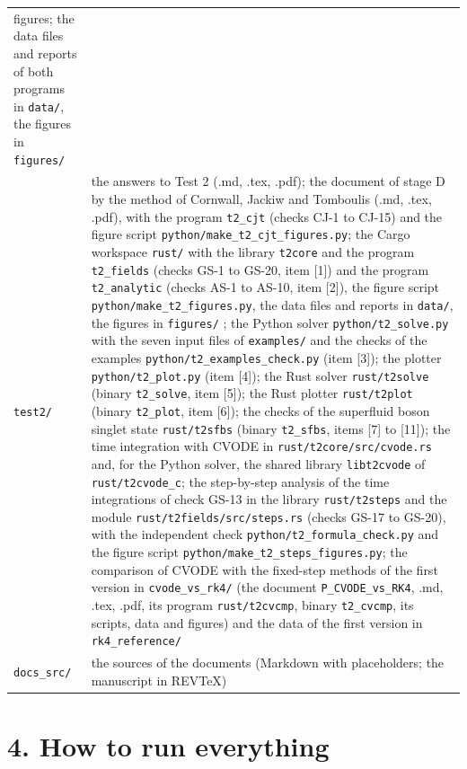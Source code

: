 \documentclass[
  10pt,
]{article}
\begin{document}
\begin{longtable}[]{@{}
  >{\raggedright\arraybackslash}p{}
  >{\raggedright\arraybackslash}p{}@{}}
figures; the data files and reports of both programs in \texttt{data/},
the figures in \texttt{figures/} \\
\texttt{test2/} & the answers to Test 2 (.md, .tex, .pdf); the document
of stage D by the method of Cornwall, Jackiw and Tomboulis (.md, .tex,
.pdf), with the program \texttt{t2\_cjt} (checks CJ-1 to CJ-15) and the
figure script \texttt{python/make\_t2\_cjt\_figures.py}; the Cargo
workspace \texttt{rust/} with the library \texttt{t2core} and the
program \texttt{t2\_fields} (checks GS-1 to GS-20, item {[}1{]}) and the
program \texttt{t2\_analytic} (checks AS-1 to AS-10, item {[}2{]}), the
figure script \texttt{python/make\_t2\_figures.py}, the data files and
reports in \texttt{data/}, the figures in \texttt{figures/} ; the Python
solver \texttt{python/t2\_solve.py} with the seven input files of
\texttt{examples/} and the checks of the examples
\texttt{python/t2\_examples\_check.py} (item {[}3{]}); the plotter
\texttt{python/t2\_plot.py} (item {[}4{]}); the Rust solver
\texttt{rust/t2solve} (binary \texttt{t2\_solve}, item {[}5{]}); the
Rust plotter \texttt{rust/t2plot} (binary \texttt{t2\_plot}, item
{[}6{]}); the checks of the superfluid boson singlet state
\texttt{rust/t2sfbs} (binary \texttt{t2\_sfbs}, items {[}7{]} to
{[}11{]}); the time integration with CVODE in
\texttt{rust/t2core/src/cvode.rs} and, for the Python solver, the shared
library \texttt{libt2cvode} of \texttt{rust/t2cvode\_c}; the
step-by-step analysis of the time integrations of check GS-13 in the
library \texttt{rust/t2steps} and the module
\texttt{rust/t2fields/src/steps.rs} (checks GS-17 to GS-20), with the
independent check \texttt{python/t2\_formula\_check.py} and the figure
script \texttt{python/make\_t2\_steps\_figures.py}; the comparison of
CVODE with the fixed-step methods of the first version in
\texttt{cvode\_vs\_rk4/} (the document \texttt{P\_CVODE\_vs\_RK4}, .md,
.tex, .pdf, its program \texttt{rust/t2cvcmp}, binary
\texttt{t2\_cvcmp}, its scripts, data and figures) and the data of the
first version in \texttt{rk4\_reference/} \\
\texttt{docs\_src/} & the sources of the documents (Markdown with
placeholders; the manuscript in REVTeX) \\
\end{longtable}

\hypertarget{how-to-run-everything}{%
\section{4. How to run everything}\label{how-to-run-everything}}
\end{document}

